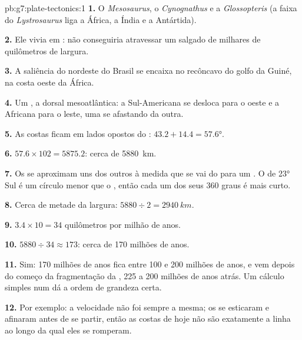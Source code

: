 \begin{solution}{pb:g7:plate-tectonics:1}
\textbf{1.} O \emph{Mesosaurus}, o \emph{Cynognathus} e a
\emph{Glossopteris} (a faixa do \emph{Lystrosaurus} liga a África, a Índia
e a Antártida).

\textbf{2.} Ele vivia em : não conseguiria atravessar um 
salgado de milhares de quilômetros de largura.

\textbf{3.} A saliência do nordeste do Brasil se encaixa no recôncavo do
golfo da Guiné, na costa oeste da África.

\textbf{4.} Um , a dorsal mesoatlântica: a 
Sul-Americana se desloca para o oeste e a  Africana para o leste, uma
se afastando da outra.

\textbf{5.} As costas ficam em lados opostos do :
$43.2 + 14.4 = \ang{57.6}$.

\textbf{6.} $57.6 \times 102 = 5875.2$: cerca de \qty{5880}{km}.

\textbf{7.} Os  se aproximam uns dos outros à medida que se vai
do  para um . O  de \ang{23} Sul é um círculo menor que
o , então cada um dos seus 360 graus é mais curto.

\textbf{8.} Cerca de metade da largura: $5880 \div 2 = \qty{2940}{km}$.

\textbf{9.} $3.4 \times 10 = 34$ quilômetros por milhão de anos.

\textbf{10.} $5880 \div 34 \approx 173$: cerca de 170 milhões de anos.

\textbf{11.} Sim: 170 milhões de anos fica entre 100 e 200 milhões de
anos, e vem depois do começo da fragmentação da , 225 a 200 milhões
de anos atrás. Um cálculo simples num  dá a ordem de grandeza certa.

\textbf{12.} Por exemplo: a velocidade não foi sempre a mesma; os
 se esticaram e afinaram antes de se partir, então as costas de
hoje não são exatamente a linha ao longo da qual eles se romperam.
\end{solution}
